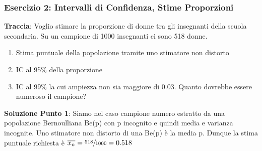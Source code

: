 
\subsubsection{Esercizio 2: Intervalli di Confidenza, Stime Proporzioni}

\textbf{Traccia}: Voglio stimare la proporzione di donne tra gli insegnanti della scuola secondaria. Su un campione di 1000 insegnanti ci sono 518 donne.
\begin{enumerate}
    \item Stima puntuale della popolazione tramite uno stimatore non distorto
    \item IC al 95\% della proporzione
    \item IC al 99\% la cui ampiezza non sia maggiore di 0.03. Quanto dovrebbe essere numeroso il campione?
\end{enumerate}

\ind \textbf{Soluzione Punto 1}: Siamo nel caso campione numero estratto da una popolazione Bernoulliana Be(p) con p incognito e quindi media e varianza incognite. Uno stimatore non distorto di una Be(p) è la media p. Dunque la stima puntuale richiesta è $ \overline{x_n} = \sfrac{518}{1000}= 0.518$ \n 

